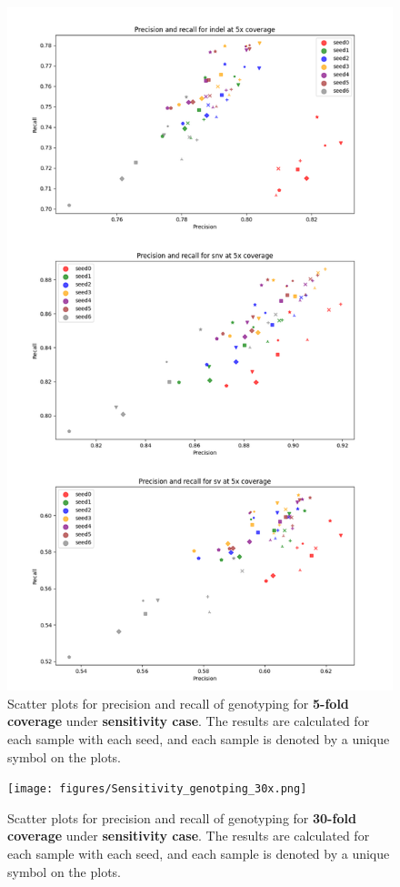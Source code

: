 \documentclass{PHlab-thesis}
\begin{document}
\begin{figure}[ht!]
	\centering
	\includegraphics[scale=0.5]{figures/Sensitivity_genotyping_5x.png}
	\caption{Scatter plots for precision and recall of genotyping for \textbf{5-fold coverage} under \textbf{sensitivity case}. The results are calculated for each sample with each seed, and each sample is denoted by a unique symbol on the plots.}
	\label{fig:sensitivity_genotyping_5x} %
\end{figure}
\begin{figure}[ht!]
	\centering
	\texttt{[image: figures/Sensitivity\_genotping\_30x.png]}
	\caption{Scatter plots for precision and recall of genotyping for \textbf{30-fold coverage} under \textbf{sensitivity case}. The results are calculated for each sample with each seed, and each sample is denoted by a unique symbol on the plots.}
	\label{fig:sensitivity_genotyping_30x} %
\end{figure}
\end{document}
